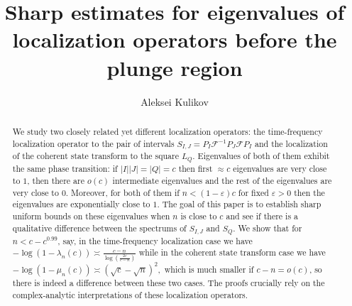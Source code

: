 \documentclass[12pt]{amsart}
\numberwithin{equation}{section}
\newcommand{\eps}{\varepsilon}
\begin{document}

  \title[Sharp estimates for eigenvalues of localization operators before the plunge region]
  {Sharp estimates for eigenvalues of localization operators before the plunge region}
\author{Aleksei Kulikov}
\address{Aleksei Kulikov,
\newline University of Copenhagen, Department of Mathematical Sciences,
Universitetsparken 5, 2100 Copenhagen, Denmark,
}


  

  \begin{abstract} We study  two closely related yet different localization operators: the time-frequency localization operator to the pair of intervals $S_{I, J} = P_I \mathcal{F}^{-1} P_J\mathcal{F} P_I$ and the localization of the coherent state transform to the square $L_Q$. Eigenvalues of both of them exhibit the same phase transition: if $|I| |J| = |Q| = c$ then first $\approx c$ eigenvalues are very close to $1$, then there are $o(c)$ intermediate eigenvalues and the rest of the eigenvalues are very close to $0$. Moreover, for both of them if $n < (1-\eps)c$ for fixed $\eps > 0$ then the eigenvalues are exponentially close to $1$. The goal of this paper is to establish sharp uniform bounds on these eigenvalues when $n$ is close to $c$ and see if there is a qualitative difference between the spectrums of $S_{I, J}$ and $S_Q$. We show that for $n < c -c^{0.99}$, say, in the time-frequency localization case  we have  $-\log(1-\lambda_n(c))\asymp\frac{c-n}{\log(\frac{2c}{c-n})}$ while in the coherent state transform case we have  $-\log(1-\mu_n(c))\asymp (\sqrt{c}-\sqrt{n})^2,$ which is much smaller if $c-n = o(c)$, so there is indeed a difference between these two cases. The proofs crucially rely on the complex-analytic interpretations of these localization operators.
\end{abstract}
  \maketitle
\pagestyle{plain}
\end{document}

